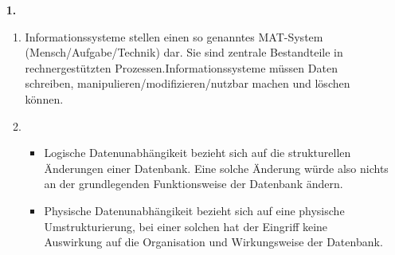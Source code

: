 \documentclass[a4paper,11pt,fleqn]{scrartcl}
\title{\titleinfo}
\author{\authorinfo}
\begin{document}
    \maketitle
    \begin{enumerate}
        \item[\textbf{1.}]
        \begin{enumerate}
                \item Informationssysteme stellen einen so genanntes MAT-System (Mensch/Aufgabe/Technik) dar. Sie
                sind zentrale Bestandteile in rechnergestützten Prozessen.Informationssysteme müssen Daten schreiben,             
                manipulieren/modifizieren/nutzbar machen und löschen können.
                
                \item 
                    \begin{itemize}
                        \item Logische Datenunabhängikeit bezieht sich auf die strukturellen Änderungen einer Datenbank.
                            Eine solche Änderung würde also nichts an der grundlegenden Funktionsweise der Datenbank ändern.
                        \item Physische Datenunabhängikeit bezieht sich auf eine physische Umstrukturierung, bei einer solchen
                            hat der Eingriff keine Auswirkung auf die Organisation und Wirkungsweise der Datenbank.
                    \end{itemize}


\end{enumerate}
\end{enumerate}
\end{document}

